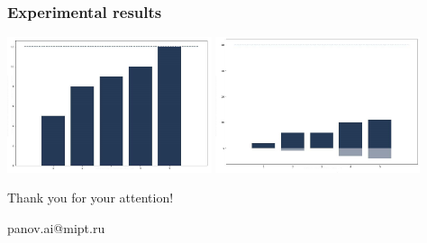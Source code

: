 \documentclass[default]{beamer}
\begin{document}
	\begin{frame}
		\frametitle{Experimental results}
		
		\centering
		\includegraphics[width=0.45\textwidth]{layers-res3}
		\quad
		\includegraphics[width=0.45\textwidth]{layers-res4}
	\end{frame}

	\begin{frame}
	
		\centering
		\Huge
		Thank you for your attention!
		\normalsize
		\par\bigskip
		\par\bigskip
		\par\bigskip
		panov.ai@mipt.ru
	\end{frame}			
\end{document}
